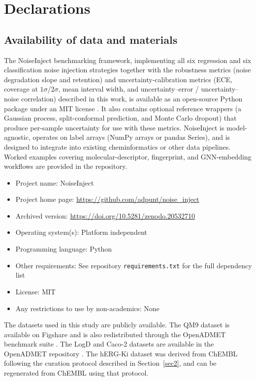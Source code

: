 \documentclass[pdflatex,sn-basic]{sn-jnl}%
\theoremstyle{thmstyleone}%
\theoremstyle{thmstyletwo}%
\theoremstyle{thmstylethree}%
\begin{document}
\section*{Declarations}

\subsection*{Availability of data and materials}

The NoiseInject benchmarking framework, implementing all six regression and six classification noise injection strategies together with the robustness metrics (noise degradation slope and retention) and uncertainty-calibration metrics (ECE, coverage at $1\sigma$/$2\sigma$, mean interval width, and uncertainty--error / uncertainty--noise correlation) described in this work, is available as an open-source Python package under an MIT license \citep{noiseinject}. It also contains optional reference wrappers (a Gaussian process, split-conformal prediction, and Monte Carlo dropout) that produce per-sample uncertainty for use with these metrics. NoiseInject is model-agnostic, operates on label arrays (NumPy arrays or pandas Series), and is designed to integrate into existing cheminformatics or other data pipelines. Worked examples covering molecular-descriptor, fingerprint, and GNN-embedding workflows are provided in the repository.

\begin{itemize}
    \item Project name: NoiseInject
    \item Project home page: \url{https://github.com/adpunt/noise_inject}
    \item Archived version: \url{https://doi.org/10.5281/zenodo.20532710}
    \item Operating system(s): Platform independent
    \item Programming language: Python
    \item Other requirements: See repository \texttt{requirements.txt} for the full dependency list
    \item License: MIT
    \item Any restrictions to use by non-academics: None
\end{itemize}

The datasets used in this study are publicly available. The QM9 dataset is available on Figshare \citep{qm9_dataset} and is also redistributed through the OpenADMET benchmark suite \citep{Ramakrishnan2014, openadmet}. The LogD and Caco-2 datasets are available in the OpenADMET repository \citep{openadmet}. The hERG-Ki dataset was derived from ChEMBL \citep{chembl_dataset, Gaulton2017} following the curation protocol described in Section~\ref{sec2}, and can be regenerated from ChEMBL using that protocol.
\end{document}

